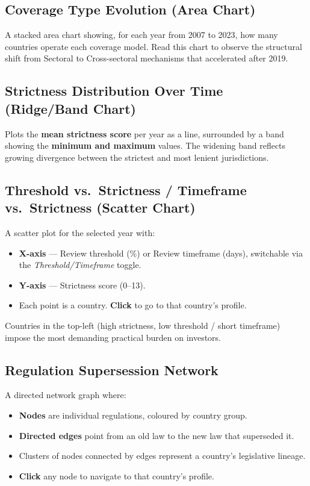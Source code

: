 \documentclass[12pt,a4paper]{article}
\newcommand{\uielem}[1]{\textit{#1}}
\begin{document}
\subsection{Coverage Type Evolution (Area Chart)}

A stacked area chart showing, for each year from 2007 to 2023, how many countries operate each coverage model. Read this chart to observe the structural shift from Sectoral to Cross-sectoral mechanisms that accelerated after 2019.

\subsection{Strictness Distribution Over Time (Ridge/Band Chart)}

Plots the \textbf{mean strictness score} per year as a line, surrounded by a band showing the \textbf{minimum and maximum} values. The widening band reflects growing divergence between the strictest and most lenient jurisdictions.

\subsection{Threshold vs.\ Strictness / Timeframe vs.\ Strictness (Scatter Chart)}

A scatter plot for the selected year with:
\begin{itemize}
  \item \textbf{X-axis} — Review threshold (\%) or Review timeframe (days), switchable via the \uielem{Threshold/Timeframe} toggle.
  \item \textbf{Y-axis} — Strictness score (0--13).
  \item Each point is a country. \textbf{Click} to go to that country's profile.
\end{itemize}

Countries in the top-left (high strictness, low threshold / short timeframe) impose the most demanding practical burden on investors.

\subsection{Regulation Supersession Network}

A directed network graph where:
\begin{itemize}
  \item \textbf{Nodes} are individual regulations, coloured by country group.
  \item \textbf{Directed edges} point from an old law to the new law that superseded it.
  \item Clusters of nodes connected by edges represent a country's legislative lineage.
  \item \textbf{Click} any node to navigate to that country's profile.
\end{itemize}
\end{document}
